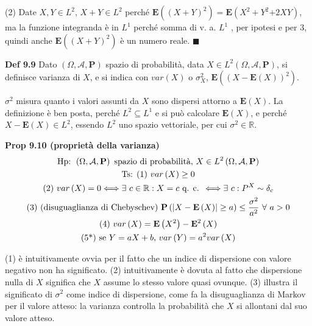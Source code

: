 \documentclass{article}
\begin{document}
(2) Date $X,Y\in L^{2}$, $X+Y\in L^{2}$ perch\'{e} $\mathbf{E}\left( \left(
X+Y\right) ^{2}\right) =\mathbf{E}\left( X^{2}+Y^{2}\mathbf{+}2XY\right) $,
ma la funzione integranda \`{e} in $L^{1}$ perch\'{e} somma di v. a. $L^{1}$%
, per ipotesi e per 3, quindi anche $\mathbf{E}\left( \left( X+Y\right)
^{2}\right) $ \`{e} un numero reale. $\blacksquare $

\textbf{Def 9.9} Dato $\left( \Omega ,\mathcal{A},\mathbf{P}\right) $ spazio
di probabilit\`{a}, data $X\in L^{2}\left( \Omega ,\mathcal{A},\mathbf{P}%
\right) $, si definisce varianza di $X$, e si indica con $var\left( X\right) 
$ o $\sigma _{X}^{2}$, $\mathbf{E}\left( \left( X-\mathbf{E}\left( X\right)
\right) ^{2}\right) $.

$\sigma ^{2}$ misura quanto i valori assunti da $X$ sono dispersi attorno a $%
\mathbf{E}\left( X\right) $. La definizione \`{e} ben posta, perch\'{e} $%
L^{2}\subseteq L^{1}$ e si pu\`{o} calcolare $\mathbf{E}\left( X\right) $, e
perch\'{e} $X-\mathbf{E}\left( X\right) \in L^{2}$, essendo $L^{2}$ uno
spazio vettoriale, per cui $\sigma ^{2}\in 
\mathbb{R}
$.

\textbf{Prop 9.10 (propriet\`{a} della varianza)}%
\begin{gather*}
\text{Hp: }\left( \Omega ,\mathcal{A},\mathbf{P}\right) \text{ spazio di
probabilit\`{a}, }X\in L^{2}\left( \Omega ,\mathcal{A},\mathbf{P}\right) \\
\text{Ts: (1) }var\left( X\right) \geq 0 \\
\text{(2) }var\left( X\right) =0\Longleftrightarrow \exists \text{ }c\in 
\mathbb{R}
:X=c\text{ q. c. }\Longleftrightarrow \exists \text{ }c:P^{X}\sim \delta _{c}
\\
\text{(3) (disuguaglianza di Chebyschev) }\mathbf{P}\left( \left\vert X-%
\mathbf{E}\left( X\right) \right\vert \geq a\right) \leq \frac{\sigma ^{2}}{%
a^{2}}\text{ }\forall \text{ }a>0 \\
\text{(4) }var\left( X\right) =\mathbf{E}\left( X^{2}\right) -\mathbf{E}%
^{2}\left( X\right) \\
\text{(5*) se }Y=aX+b\text{, }var\left( Y\right) =a^{2}var\left( X\right)
\end{gather*}

(1) \`{e} intuitivamente ovvia per il fatto che un indice di dispersione con
valore negativo non ha significato. (2) intuitivamente \`{e} dovuta al fatto
che dispersione nulla di $X$ significa che $X$ assume lo stesso valore quasi
ovunque. (3) illustra il significato di $\sigma ^{2}$ come indice di
dispersione, come fa la disuguaglianza di Markov per il valore atteso: la
varianza controlla la probabilit\`{a} che $X$ si allontani dal suo valore
atteso.
\end{document}
